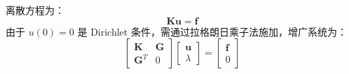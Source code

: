 \documentclass[engineeringmaster]{hquThesis}
\begin{document}
离散方程为：
\begin{equation}
    \boldsymbol{K} \boldsymbol{u} = \boldsymbol{f}
    \label{eq:galerkin_meshless}
\end{equation}
由于 \( u(0) = 0 \) 是 Dirichlet 条件，需通过拉格朗日乘子法施加，增广系统为：
\begin{equation}
    \begin{bmatrix}
        \boldsymbol{K} & \boldsymbol{G} \\
        \boldsymbol{G}^T & 0
    \end{bmatrix}
    \begin{bmatrix}
        \boldsymbol{u} \\
        \lambda
    \end{bmatrix}
    =
    \begin{bmatrix}
        \boldsymbol{f} \\
        0
    \end{bmatrix}
    \label{eq:augmented_system}
\end{equation}
\end{document}
